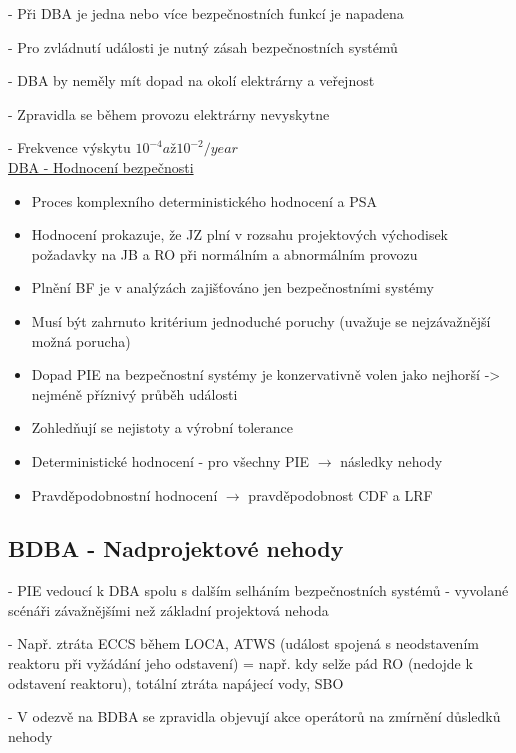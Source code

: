 \noindent - 	Při DBA je jedna nebo více bezpečnostních funkcí je napadena

\noindent - 	Pro zvládnutí události je nutný zásah bezpečnostních systémů

\noindent - 	DBA by neměly mít dopad na okolí elektrárny a veřejnost

\noindent - 	Zpravidla se během provozu elektrárny nevyskytne

\noindent - 	Frekvence výskytu $10^{-4} až 10^{-2}/year$
\\

\underline{DBA - Hodnocení bezpečnosti}

\begin{itemize}
    \item Proces komplexního deterministického hodnocení a PSA
    \item Hodnocení prokazuje, že JZ plní v rozsahu projektových východisek požadavky na JB a RO při normálním a abnormálním provozu
    \item Plnění BF je v analýzách zajišťováno jen bezpečnostními systémy
    \item Musí být zahrnuto kritérium jednoduché poruchy (uvažuje se nejzávažnější možná porucha)
    \item Dopad PIE na bezpečnostní systémy je konzervativně volen jako nejhorší -> nejméně příznivý průběh události
    \item Zohledňují se nejistoty a výrobní tolerance
    \item Deterministické hodnocení - pro všechny PIE $\rightarrow$ následky nehody
    \item Pravděpodobnostní hodnocení $\rightarrow$ pravděpodobnost CDF a LRF
\end{itemize}


\subsection{BDBA - Nadprojektové nehody}

\noindent - 	PIE vedoucí k DBA spolu s dalším selháním bezpečnostních systémů - vyvolané scénáři závažnějšími než základní projektová nehoda

\noindent - 	Např. ztráta ECCS během LOCA, ATWS (událost spojená s neodstavením reaktoru při vyžádání jeho odstavení) = např. kdy selže pád RO (nedojde k odstavení reaktoru), totální ztráta napájecí vody, SBO

\noindent - 	V odezvě na BDBA se zpravidla objevují akce operátorů na zmírnění důsledků nehody

